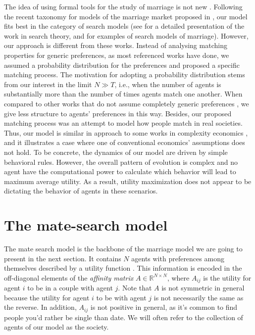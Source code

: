 \documentclass[12pt]{article}
\begin{document}
The idea of using formal tools for the study of marriage is not new \cite{10.2307/1831130,10.2307/1829987,10.2307/1837421}. Following the recent taxonomy for models of the marriage market proposed in \cite{doi:10.1146/annurev-economics-012320-121610}, our model fits best in the category of search models (see \cite{10.2307/23045893,10.1257/002205105775362014,doi:10.1146/annurev-economics-111809-125046,10.1257/jel.20150777} for a detailed presentation of the work in search theory, and  \cite{10.2307/2780247,10.2307/2951279,Burdett1999LongTermPF,10.2307/2999430,10.2307/44955185,RePEc:bpj:bejmac:v:advances.1:y:2001:i:1:n:5} for examples of search models of marriage). However, our approach is different from these works. Instead of analysing matching properties for generic preferences, as most referenced works have done, we assumed a probability distribution for the preferences and proposed a specific matching process. The motivation for adopting a probability distribution stems from our interest in the limit $N\gg T$, i.e., when the number of agents is substantially more than the number of times agents match one another. When compared to other works that do not assume completely generic preferences \cite{doi:10.1086/689869,10.1093/restud/rdw041}, we give less structure to agents' preferences in this way. Besides, our proposed matching process was an attempt to model how people match in real societies. Thus, our model is similar in approach to some works in complexity economics \cite{comecon,10.5555/547051}, and it illustrates a case where one of conventional economics' assumptions does not hold. To be concrete, the dynamics of our model are driven by simple behavioral rules. However, the overall pattern of evolution is complex and no agent have the computational power to calculate which behavior will lead to maximum average utility. As a result, utility maximization does not appear to be dictating the behavior of agents in these scenarios.


\section{The mate-search model}
\label{dynamicalmatching}

The mate search model is the backbone of the marriage model we are going to present in the next section. It contains $N$ agents with preferences among themselves described by a utility function \cite{mas1995microeconomic}. This information is encoded in the off-diagonal elements of the \textit{affinity matrix} $A\in\mathbb{R}^{N\times N}$, where $A_{ij}$ is the utility for agent $i$ to be in a couple with agent $j$. Note that $A$ is not symmetric in general because the utility for agent $i$ to be with agent $j$ is not necessarily the same as the reverse. In addition, $A_{ij}$ is not positive in general, as it's common to find people you'd rather be single than date. %
We will often refer to the collection of agents of our model as the society.
\end{document}
